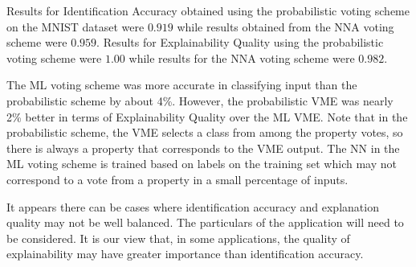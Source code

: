 \documentclass[conference]{IEEEtran}
\begin{document}
Results for Identification Accuracy obtained using the probabilistic voting scheme on the MNIST dataset were $0.919$ while results obtained from the NNA voting scheme were $0.959$.  Results for Explainability Quality using the probabilistic voting scheme were $1.00$ while results for the NNA voting scheme were $0.982$.

The ML voting scheme was more accurate in classifying input than the probabilistic scheme by about 4\%.   However, the probabilistic VME was nearly 2\% better in terms of Explainability Quality over the ML VME.  Note that in the probabilistic scheme, the VME selects a class from among the property votes, so there is always a property that corresponds to the VME output.  The NN in the ML voting scheme is trained based on labels on the training set which may not correspond to a vote from a property in a small percentage of inputs.

It appears there can be cases where identification accuracy and explanation quality may not be well balanced.  The particulars of the application will need to be considered.  It is our view that, in some applications, the quality of explainability may have greater importance than identification accuracy.


{}
\end{document}
